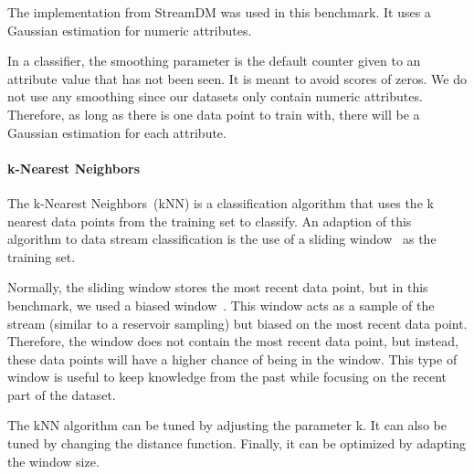 The implementation from StreamDM was used in this
benchmark. It uses a Gaussian
estimation for numeric attributes.

In a \naivebayes classifier, the smoothing parameter is the
default counter given to an attribute value that
has not been seen. It is meant to avoid scores of zeros.
We do not use any smoothing since our datasets
only contain numeric
attributes. Therefore, as long as there is one data
point to train with, there will be a Gaussian
estimation for each attribute.

\paragraph{k-Nearest Neighbors}

The k-Nearest Neighbors~(kNN) is a classification
algorithm that uses the k nearest data points from
the training set to classify.  An adaption of this
algorithm to data stream classification is the use
of a sliding window~\cite{Mining_Massive_Datasets}
as the training set.

Normally, the sliding window stores the most
recent data point, but in this benchmark, we used
a biased window~\cite{biased_reservoir_sampling}.
This window acts as a sample of
the stream (similar to a reservoir sampling) but
biased on the most recent data point.  Therefore,
the window does not contain the most recent data
point, but instead, these data points will have a
higher chance of being in the window.  This type
of window is useful to keep knowledge from the
past while focusing on the recent part of the
dataset.

The kNN algorithm can be tuned by adjusting the
parameter k. It can also be tuned by changing the
distance function. Finally, it can be optimized by
adapting the window size.

